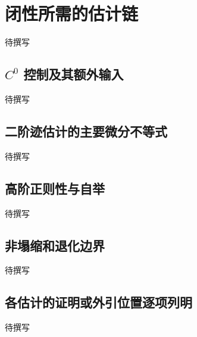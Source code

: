 
% 
% 

\section{闭性所需的估计链}
\label{g4:sec:3103}

待撰写

\subsection{\texorpdfstring{\(C^0\) 控制及其额外输入}{C⁰ 控制及其额外输入}}
\label{g4:subsec:3103:01}
待撰写

\subsection{二阶迹估计的主要微分不等式}
\label{g4:subsec:3103:02}
待撰写

\subsection{高阶正则性与自举}
\label{g4:subsec:3103:03}
待撰写

\subsection{非塌缩和退化边界}
\label{g4:subsec:3103:04}
待撰写

\subsection{各估计的证明或外引位置逐项列明}
\label{g4:subsec:3103:05}
待撰写
